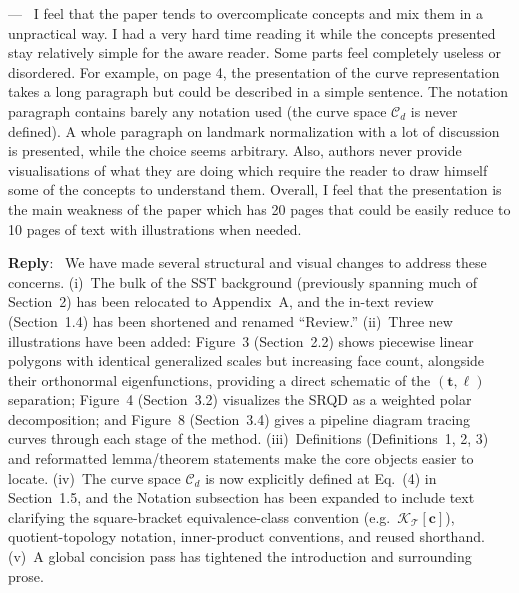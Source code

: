 \documentclass[11pt]{article}
\newcounter{reviewer}
\newcounter{point}[reviewer]
\renewcommand{\thepoint}{Comment\,\thereviewer.\arabic{point}}
\newenvironment{point}
   {\refstepcounter{point} \bigskip \noindent {\textbf{Reviewer~\thepoint} } ---\ }
   {\par }
\newenvironment{reply}
   {\medskip \noindent \color{blue} \begin{sf}\textbf{Reply}:\  }
   {\medskip \par \end{sf}}
\begin{document}
\begin{point}
I feel that the paper tends to overcomplicate concepts and mix them in a unpractical way. I had a very hard time reading it while the concepts presented stay relatively simple for the aware reader. Some parts feel completely useless or disordered. For example, on page 4, the presentation of the curve representation takes a long paragraph but could be described in a simple sentence. The notation paragraph contains barely any notation used (the curve space $\mathcal{C}_d$ is never defined). A whole paragraph on landmark normalization with a lot of discussion is presented, while the choice seems arbitrary. Also, authors never provide visualisations of what they are doing which require the reader to draw himself some of the concepts to understand them. Overall, I feel that the presentation is the main weakness of the paper which has 20 pages that could be easily reduce to 10 pages of text with illustrations when needed.
\end{point}
\begin{reply}
We have made several structural and visual changes to address these concerns. (i)~The bulk of the SST background (previously spanning much of Section~2) has been relocated to Appendix~A, and the in-text review (Section~1.4) has been shortened and renamed ``Review.'' (ii)~Three new illustrations have been added: Figure~3 (Section~2.2) shows piecewise linear polygons with identical generalized scales but increasing face count, alongside their orthonormal eigenfunctions, providing a direct schematic of the $(\boldsymbol{t},\boldsymbol{\ell})$ separation; Figure~4 (Section~3.2) visualizes the SRQD as a weighted polar decomposition; and Figure~8 (Section~3.4) gives a pipeline diagram tracing curves through each stage of the method. (iii)~Definitions (Definitions~1, 2, 3) and reformatted lemma/theorem statements make the core objects easier to locate. (iv)~The curve space $\mathcal{C}_d$ is now explicitly defined at Eq.~(4) in Section~1.5, and the Notation subsection has been expanded to include text clarifying the square-bracket equivalence-class convention (e.g.\ $\mathcal{K}_{\mathcal{T}}[\boldsymbol{c}]$), quotient-topology notation, inner-product conventions, and reused shorthand. (v)~A global concision pass has tightened the introduction and surrounding prose.
\end{reply}
\end{document}
